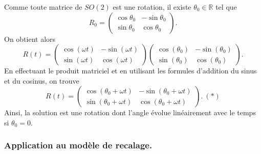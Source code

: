 \documentclass[12pt]{report}
\begin{document}
Comme toute matrice de $SO(2)$ est une rotation, il existe $\theta_0\in\mathbb{R}$ tel que
\[
R_0=\begin{pmatrix}\cos\theta_0 & -\sin\theta_0 \\\sin\theta_0 & \cos\theta_0\end{pmatrix}.
\]
On obtient alors
\[
R(t)=\begin{pmatrix}\cos(\omega t) & -\sin(\omega t) \\\sin(\omega t) & \cos(\omega t)\end{pmatrix}\begin{pmatrix}\cos(\theta_0) & -\sin(\theta_0) \\\sin(\theta_0) & \cos(\theta_0)\end{pmatrix}.
\]
En effectuant le produit matriciel et en utilisant les formules d'addition du sinus et du cosinus, on trouve
\[
R(t)=\begin{pmatrix}\cos(\theta_0+\omega t) & -\sin(\theta_0+\omega t) \\\sin(\theta_0+\omega t) & \cos(\theta_0+\omega t)\end{pmatrix}.~(*)
\]
Ainsi, la solution est une rotation dont l'angle évolue linéairement avec le temps si $\theta_0=0$.

\subsubsection{Application au modèle de recalage.}
\end{document}
